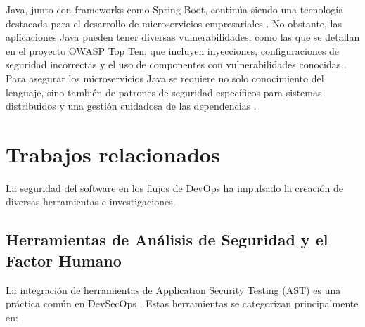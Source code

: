 Java, junto con frameworks como Spring Boot, continúa siendo una tecnología destacada para el desarrollo de microservicios empresariales \cite{FiniteState2023JavaVulnerabilities}. No obstante, las aplicaciones Java pueden tener diversas vulnerabilidades, como las que se detallan en el proyecto OWASP Top Ten, que incluyen inyecciones, configuraciones de seguridad incorrectas y el uso de componentes con vulnerabilidades conocidas \cite{OWASP2021TopTen}. Para asegurar los microservicios Java se requiere no solo conocimiento del lenguaje, sino también de patrones de seguridad específicos para sistemas distribuidos y una gestión cuidadosa de las dependencias \cite{FiniteState2023JavaVulnerabilities, OWASP2021TopTen}.

\section{Trabajos relacionados}\label{sec:trabajos_relacionados}
La seguridad del software en los flujos de DevOps ha impulsado la creación de diversas herramientas e investigaciones.

\subsection{Herramientas de Análisis de Seguridad y el Factor Humano}
La integración de herramientas de Application Security Testing (AST) es una práctica común en DevSecOps \cite{Kumar2022DevSecOpsReview}. Estas herramientas se categorizan principalmente en:

